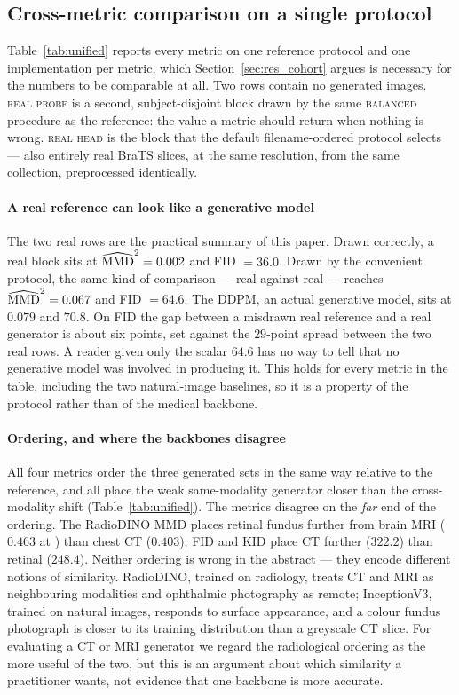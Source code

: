 \subsection{Cross-metric comparison on a single protocol}
\label{sec:res_baselines}

Table~\ref{tab:unified} reports every metric on one reference protocol and one
implementation per metric, which Section~\ref{sec:res_cohort} argues is
necessary for the numbers to be comparable at all. Two rows contain no
generated images. \textsc{real probe} is a second, subject-disjoint block drawn
by the same \textsc{balanced} procedure as the reference: the value a metric
should return when nothing is wrong. \textsc{real head} is the block that the
default filename-ordered protocol selects --- also entirely real BraTS slices,
at the same resolution, from the same collection, preprocessed identically.

\paragraph{A real reference can look like a generative model}
The two real rows are the practical summary of this paper. Drawn correctly, a
real block sits at $\widehat{\mathrm{MMD}}^2 = 0.002$ and FID $= 36.0$. Drawn by the
convenient protocol, the same kind of comparison --- real against real ---
reaches $\widehat{\mathrm{MMD}}^2 = 0.067$ and FID $= 64.6$. The DDPM, an actual
generative model, sits at $0.079$ and $70.8$. On FID the gap between a misdrawn
real reference and a real generator is about six points, set against the
$29$-point spread between the two real rows. A reader given only the scalar
$64.6$ has no way to tell that no generative model was involved in producing
it. This holds for every metric in the table, including the two
natural-image baselines, so it is a property of the protocol rather than of the
medical backbone.

\paragraph{Ordering, and where the backbones disagree}
All four metrics order the three generated sets in the same way relative to the
reference, and all place the weak same-modality generator closer than the
cross-modality shift (Table~\ref{tab:unified}). The metrics disagree on the
\emph{far} end of the ordering. The RadioDINO MMD places retinal fundus further
from brain MRI ($0.463$ at ) than chest CT ($0.403$); FID and KID place
CT further ($322.2$) than retinal ($248.4$). Neither ordering is wrong in the
abstract --- they encode different notions of similarity. RadioDINO, trained on
radiology, treats CT and MRI as neighbouring modalities and ophthalmic
photography as remote; InceptionV3, trained on natural images, responds to
surface appearance, and a colour fundus photograph is closer to its training
distribution than a greyscale CT slice. For evaluating a CT or MRI generator we
regard the radiological ordering as the more useful of the two, but this is an
argument about which similarity a practitioner wants, not evidence that one
backbone is more accurate.

